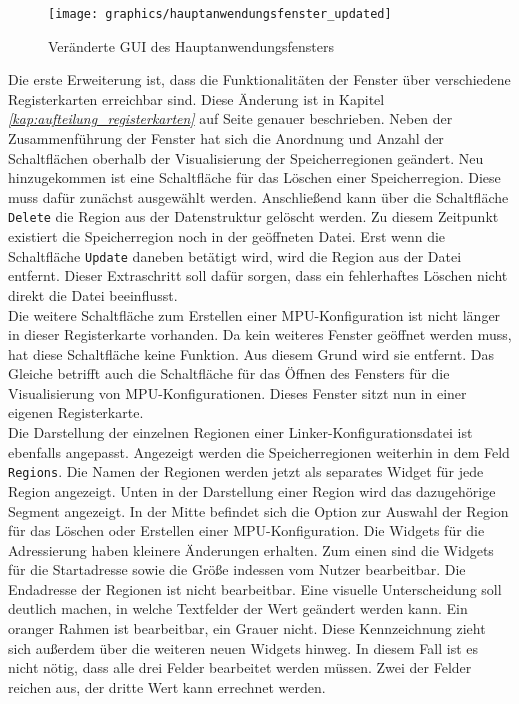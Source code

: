 \begin{figure}[H]
	\centering
	\texttt{[image: graphics/hauptanwendungsfenster\_updated]}
	\caption{Veränderte \acs{GUI} des Hauptanwendungsfensters}
	\label{fig:hauptanwendungsfensterupdated}
\end{figure}

Die erste Erweiterung ist, dass die Funktionalitäten der Fenster über verschiedene Registerkarten erreichbar sind.
Diese Änderung ist in Kapitel \textit{\ref{kap:aufteilung_registerkarten} } auf Seite \pageref{kap:aufteilung_registerkarten} genauer beschrieben.
Neben der Zusammenführung der Fenster hat sich die Anordnung und Anzahl der Schaltflächen oberhalb der Visualisierung der Speicherregionen geändert.
Neu hinzugekommen ist eine Schaltfläche für das Löschen einer Speicherregion.
Diese muss dafür zunächst ausgewählt werden.
Anschließend kann über die Schaltfläche \verb*|Delete| die Region aus der Datenstruktur gelöscht werden.
Zu diesem Zeitpunkt existiert die Speicherregion noch in der geöffneten Datei.
Erst wenn die Schaltfläche \verb*|Update| daneben betätigt wird, wird die Region aus der Datei entfernt.
Dieser Extraschritt soll dafür sorgen, dass ein fehlerhaftes Löschen nicht direkt die Datei beeinflusst. \\

Die weitere Schaltfläche zum Erstellen einer MPU-Konfiguration ist nicht länger in dieser Registerkarte vorhanden.
Da kein weiteres Fenster geöffnet werden muss, hat diese Schaltfläche keine Funktion.
Aus diesem Grund wird sie entfernt.
Das Gleiche betrifft auch die Schaltfläche für das Öffnen des Fensters für die Visualisierung von \acs{MPU}-Konfigurationen.
Dieses Fenster sitzt nun in einer eigenen Registerkarte. \\

Die Darstellung der einzelnen Regionen einer Linker-Konfigurationsdatei ist ebenfalls angepasst.
Angezeigt werden die Speicherregionen weiterhin in dem Feld \verb*|Regions|.
Die Namen der Regionen werden jetzt als separates Widget für jede Region angezeigt.
Unten in der Darstellung einer Region wird das dazugehörige Segment angezeigt.
In der Mitte befindet sich die Option zur Auswahl der Region für das Löschen oder Erstellen einer \acs{MPU}-Konfiguration.
Die Widgets für die Adressierung haben kleinere Änderungen erhalten.
Zum einen sind die Widgets für die Startadresse sowie die Größe indessen vom Nutzer bearbeitbar.
Die Endadresse der Regionen ist nicht bearbeitbar.
Eine visuelle Unterscheidung soll deutlich machen, in welche Textfelder der Wert geändert werden kann.
Ein oranger Rahmen ist bearbeitbar, ein Grauer nicht.
Diese Kennzeichnung zieht sich außerdem über die weiteren neuen Widgets hinweg.
In diesem Fall ist es nicht nötig, dass alle drei Felder bearbeitet werden müssen.
Zwei der Felder reichen aus, der dritte Wert kann errechnet werden. \\

